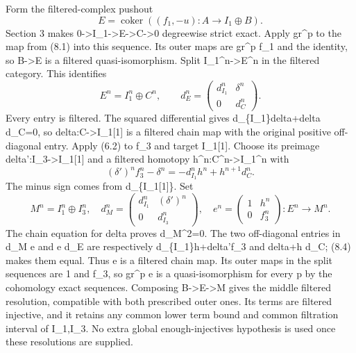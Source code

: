 Form the filtered-complex pushout \[
 E=\operatorname{coker}
       ((f_1,-u):A\to I_1\oplus B).                          \tag{8.2}
\] Section 3 makes 0\allowbreak{}->I\_\allowbreak{}1\allowbreak{}->E\allowbreak{}->C\allowbreak{}->0 degreewise strict exact. Apply gr\^{}p to the map from (8.1)\allowbreak{} into this sequence. Its outer maps are gr\^{}p f\_\allowbreak{}1 and the identity,\allowbreak{} so B\allowbreak{}->E is a filtered quasi-isomorphism. Split I\_\allowbreak{}1\textasciicircum{}n\allowbreak{}->E\textasciicircum{}n in the filtered category. This identifies \[
 E^n=I_1^n\oplus C^n,\qquad
 d_E^n=\begin{pmatrix}d_{I_1}^n&\delta^n\\0&d_C^n\end{pmatrix}.
                                                               \tag{8.3}
\] Every entry is filtered. The squared differential gives d\_\allowbreak{}\{I\_\allowbreak{}1\}delta\allowbreak{}+delta d\_\allowbreak{}C\allowbreak{}=0,\allowbreak{} so delta:\allowbreak{}C\allowbreak{}->I\_\allowbreak{}1[1]\allowbreak{} is a filtered chain map with the original positive off-diagonal entry. Apply (6.2)\allowbreak{} to f\_\allowbreak{}3 and target I\_\allowbreak{}1[1]\allowbreak{}. Choose its preimage delta':\allowbreak{}I\_\allowbreak{}3\allowbreak{}->I\_\allowbreak{}1[1]\allowbreak{} and a filtered homotopy h\textasciicircum{}n:\allowbreak{}C\textasciicircum{}n\allowbreak{}->I\_\allowbreak{}1\textasciicircum{}n with \[
 (\delta')^n f_3^n-\delta^n
      =-d_{I_1}^n h^n+h^{n+1}d_C^n.                         \tag{8.4}
\] The minus sign comes from d\_\allowbreak{}\{I\_\allowbreak{}1[1]\allowbreak{}\}. Set \[
 M^n=I_1^n\oplus I_3^n,\quad
 d_M^n=\begin{pmatrix}d_{I_1}^n&(\delta')^n\\0&d_{I_3}^n\end{pmatrix},
 \quad
 e^n=
 \begin{pmatrix}1&h^n\\0&f_3^n\end{pmatrix}:E^n\to M^n.        \tag{8.5}
\] The chain equation for delta\textquotesingle{} proves d\_\allowbreak{}M\textasciicircum{}2\allowbreak{}=0. The two off-diagonal entries in d\_\allowbreak{}M e and e d\_\allowbreak{}E are respectively d\_\allowbreak{}\{I\_\allowbreak{}1\}h\allowbreak{}+delta'f\_\allowbreak{}3 and delta\allowbreak{}+h d\_\allowbreak{}C; (8.4)\allowbreak{} makes them equal. Thus e is a filtered chain map. Its outer maps in the split sequences are 1 and f\_\allowbreak{}3,\allowbreak{} so gr\^{}p e is a quasi-isomorphism for every p by the cohomology exact sequences. Composing B\allowbreak{}->E\allowbreak{}->M gives the middle filtered resolution,\allowbreak{} compatible with both prescribed outer ones. Its terms are filtered injective,\allowbreak{} and it retains any common lower term bound and common filtration interval of I\_\allowbreak{}1,\allowbreak{}I\_\allowbreak{}3. No extra global enough-injectives hypothesis is used once these resolutions are supplied.

